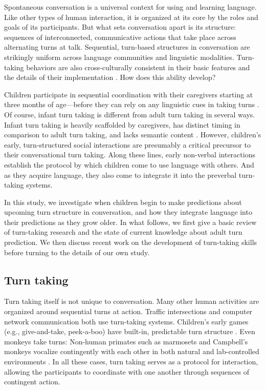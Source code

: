 \documentclass[authoryear, 12pt]{elsarticle}
\begin{document}
Spontaneous conversation is a universal context for using and learning language. Like other types of human interaction, it is organized at its core by the roles and goals of its participants. But what sets conversation apart is its structure: sequences of interconnected, communicative actions that take place across alternating turns at talk. Sequential, turn-based structures in conversation are strikingly uniform across language communities and linguistic modalities. Turn-taking behaviors are also cross-culturally consistent in their basic features and the details of their implementation \citep{de-vosInPrep, dingemanse2013, stivers2009}. How does this ability develop? 

Children participate in sequential coordination with their caregivers starting at three months of age---before they can rely on any linguistic cues in taking turns \citep[see, among others, ][]{bateson1975, hilbrinkInPrep, jaffe2001, snow1977}. Of course, infant turn taking is different from adult turn taking in several ways. Infant turn taking is heavily scaffolded by caregivers, has distinct timing in comparison to adult turn taking, and lacks semantic content \citep{hilbrinkInPrep, jaffe2001}. However, children's early, turn-structured social interactions are presumably a critical precursor to their conversational turn taking. Along these lines, early non-verbal interactions establish the protocol by which children come to use language with others. And as they acquire language, they also come to integrate it into the preverbal turn-taking systems.

In this study, we investigate when children begin to make predictions about upcoming turn structure in conversation, and how they integrate language into their predictions as they grow older. In what follows, we first give a basic review of turn-taking research and the state of current knowledge about adult turn prediction. We then discuss recent work on the development of turn-taking skills before turning to the details of our own study.

\subsection{Turn taking}

Turn taking itself is not unique to conversation. Many other human activities are organized around sequential turns at action. Traffic intersections and computer network communication both use turn-taking systems. Children's early games (e.g., give-and-take, peek-a-boo) have built-in, predictable turn structure \citep{ratner1978, ross1987}. Even monkeys take turns: Non-human primates such as marmosets and Campbell's monkeys vocalize contingently with each other in both natural and lab-controlled environments \citep{lemasson2011, takahashi2013}. In all these cases, turn taking serves as a protocol for interaction, allowing the participants to coordinate with one another through sequences of contingent action. 
\end{document}
